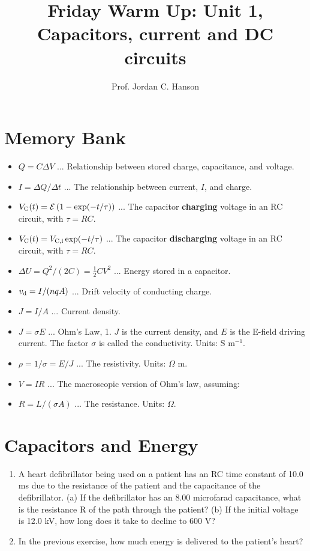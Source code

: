 \documentclass{article}
\begin{document}
\twocolumn

\title{Friday Warm Up: Unit 1, Capacitors, current and DC circuits}
\author{Prof. Jordan C. Hanson}

\maketitle

\section{Memory Bank}

\begin{itemize}
\item $Q = C\Delta V$ ... Relationship between stored charge, capacitance, and voltage.
\item $I = \Delta Q / \Delta t$ ... The relationship between current, $I$, and charge.
\item $V_{\rm C}(t) = \mathcal{E}\left(1 - \exp(-t/\tau)\right)$ ... The capacitor \textbf{charging} voltage in an RC circuit, with $\tau = RC$.
\item $V_{\rm C}(t) = V_{\rm C,i}\exp(-t/\tau)$ ... The capacitor \textbf{discharging} voltage in an RC circuit, with $\tau = RC$.
\item $\Delta U = Q^2/(2C) = \frac{1}{2}CV^2$ ... Energy stored in a capacitor.
\item $v_{\rm d} = I/(n q A)$ ... Drift velocity of conducting charge.
\item $J = I/A$ ... Current density.
\item $J = \sigma E$ ... Ohm's Law, 1.  $J$ is the current density, and $E$ is the E-field driving current.  The factor $\sigma$ is called the conductivity.  Units: S m$^{-1}$.
\item $\rho = 1/\sigma = E/J$ ... The resistivity.  Units: $\Omega$ m.
\item $V = IR$ ... The macroscopic version of Ohm's law, assuming:
\item $R = L/(\sigma A)$ ... The resistance.  Units: $\Omega$.
\end{itemize}

\section{Capacitors and Energy}

\begin{enumerate}
\item A heart defibrillator being used on a patient has an RC time constant of 10.0 ms due to the resistance of the patient and the capacitance of the defibrillator. (a) If the defibrillator has an 8.00 microfarad capacitance, what is the resistance R of the path through the patient? (b) If the initial voltage is 12.0 kV, how long does it take to decline to 600 V? \\ \vspace{2cm}
\item In the previous exercise, how much energy is delivered to the patient's heart? \\ \vspace{1cm}
\end{enumerate}
\end{document}

